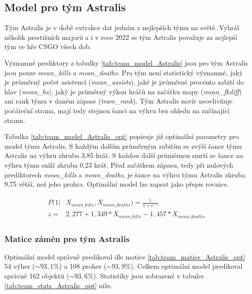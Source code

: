 \subsection{Model pro tým Astralis}
Tým Astralis je v době extrakce dat jedním z nejlepších týmu na světě. Vyhrál několik prestižních majorů a i v roce 2022 se tým Astralis považuje za nejlepší tým
ve hře \ac{CSGO} všech dob.



Významné prediktory z tabulky \ref{tab:team_model_Astralis} jsou pro tým Astralis jsou pouze \textit{mean\_kills} a \textit{mean\_deaths}.  Pro tým
není statistický významné, jaký je průměrný počet asistencí (\textit{mean\_assists}), jaké je průměrné procento zabití do hlav (\textit{mean\_hs}), jaký je
průměrný výkon hráčů na začátku mapy (\textit{mean\_fkdiff}) ani rank týmu v daném zápase (\textit{team\_rank}). Tým Astralis navíc neovlivňuje počáteční strana,
mají tedy stejnou šanci na výhru bez ohledu na začínající stranu.



Tabulka \ref{tab:team_model_Astralis_opt} popisuje již optimální parametry pro model týmu Astralis. S každým dalším průměrným zabitím se zvýší šance
týmu Astralis na výhru zhruba 3,85 krát. S každou další průměrnou smrtí se šance na výhru týmu sníží zhruba 0,23 krát. 
Před začátkem zápasu, tedy při nulových prediktorech \textit{mean\_kills} a \textit{mean\_deaths}, je šance na výhru týmu Astralis zhruba 9,75 větší, než jeho
prohra. Optimální model lze zapsat jako přepis rovnice.

\begin{align*}
    \begin{split}
        P(1 | &X_{mean\_kills},  X_{mean\_deaths}) = \frac{1}{1 + e^{-z}} \\
        z = &2,277 + 1,349*X_{mean\_kills} - 1,457*X_{mean\_deaths}
    \end{split}
\end{align*}

\subsubsection{Matice záměn pro tým Astralis}



Optimální model správně predikoval dle matice \ref{tab:team_matice_Astralis_opt} 54 výher ($\sim 93,1\%$) a 108 proher ($\sim 93,9\%$). Celkem optimální
model predikoval správně 162 objektů ($\sim 93,6\%$). Statistiky jsou zobrazené v tabulce \ref{tab:team_stats_Astralis_opt} níže.

